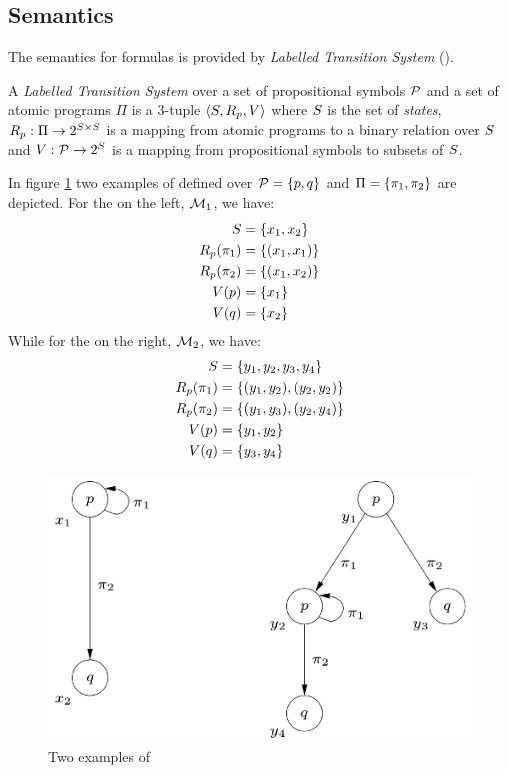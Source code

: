 \subsection{Semantics}
The semantics for \PDL formulas is provided by \emph{Labelled Transition System} (\LTS). 
\begin{definition}
	A \emph{Labelled Transition System} over a set of propositional symbols $\mathcal{P}$ and a set of atomic programs $\Pi$ is a 3-tuple $\langle S, R_p, V \rangle$ where $S$ is the set of \emph{states}, $R_p: \Pi \to 2^{S \times S}$ is a mapping from atomic programs to a binary relation over $S$ and $V: \mathcal{P} \to 2^{S}$ is a mapping from propositional symbols to subsets of $S$.
\end{definition}

\begin{example}\label{lts-example}
	In figure \ref{lts-figure} two examples of \LTS defined over $\mathcal{P} = \{p, q\}$ and $\Pi = \{\pi_1,\pi_2\}$ are depicted. For the \LTS on the left, $\mathcal{M}_1$,  we have:
	\begin{align*}
	S &= \{x_1, x_2\}\\
	R_p(\pi_1) &= \{(x_1, x_1)\}\\
	R_p(\pi_2) &= \{(x_1, x_2)\}\\
	V(p) &= \{x_1\}\\
	V(q) &= \{x_2\}\\	
	\end{align*}
	While for the \LTS on the right, $\mathcal{M}_2$,  we have:
	\begin{align*}
	S &= \{y_1, y_2, y_3, y_4\}\\
	R_p(\pi_1) &= \{(y_1, y_2), (y_2, y_2)\}\\
	R_p(\pi_2) &= \{(y_1, y_3), (y_2, y_4)\}\\
	V(p) &= \{y_1, y_2\}\\
	V(q) &= \{y_3, y_4\}\\
	\end{align*}
	\begin{figure}[h]
		\centering	
		\includegraphics[width=.8\linewidth]{images/bisimilar-LTS-tras}
		\caption{\label{lts-figure}Two examples of \LTS}
	\end{figure}
\end{example}

